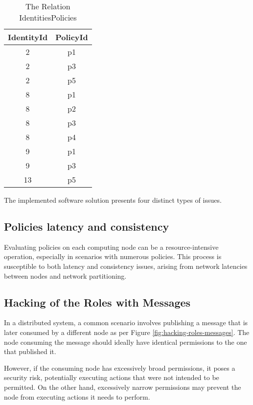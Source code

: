 \begin{table*}[htbp]
    \caption{The Relation IdentitiesPolicies}
    \label{table:table-identities-policies}
    \begin{center}
    \begin{tabular}{|c|c|}
    \hline
    IdentityId & PolicyId\\
    \hline
    2 & p1\\
    \hline
    2 & p3\\
    \hline
    2 & p5\\
    \hline
    8 & p1\\
    \hline
    8 & p2\\
    \hline
    8 & p3\\
    \hline
    8 & p4\\
    \hline
    9 & p1\\
    \hline
    9 & p3\\
    \hline
    13 & p5\\
    \hline
    \end{tabular}
    \end{center}
\end{table*}


\newpage

The implemented software solution presents four distinct types of issues.

\subsection{Policies latency and consistency}
\label{sec:policies-latency-consistency}

Evaluating policies on each computing node can be a resource-intensive operation, especially in scenarios with numerous policies. This process is susceptible to both latency and consistency issues, arising from network latencies between nodes and network partitioning.

\subsection{Hacking of the Roles with Messages}
\label{sec:hacking-role-messages}

In a distributed system, a common scenario involves publishing a message that is later consumed by a different node as per Figure \ref{fig:hacking-roles-messages}.
The node consuming the message should ideally have identical permissions to the one that published it.

However, if the consuming node has excessively broad permissions, it poses a security risk, potentially executing actions that were not intended to be permitted. 
On the other hand, excessively narrow permissions may prevent the node from executing actions it needs to perform.

